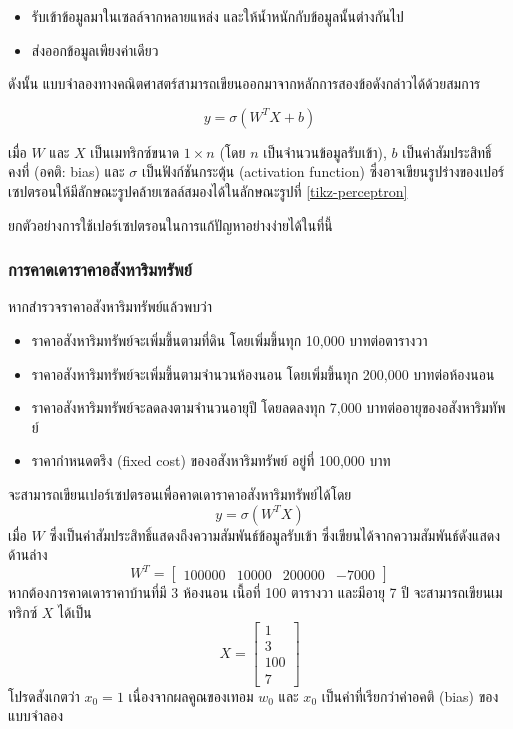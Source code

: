 \begin{itemize}
    \item รับเข้าข้อมูลมาในเซลล์จากหลายแหล่ง และให้น้ำหนักกับข้อมูลนั้นต่างกันไป
    \item ส่งออกข้อมูลเพียงค่าเดียว
\end{itemize}

ดังนั้น แบบจำลองทางคณิตศาสตร์สามารถเขียนออกมาจากหลักการสองข้อดังกล่าวได้ด้วยสมการ

\begin{equation}
y = \sigma\left(W^TX+b\right)
\end{equation}

เมื่อ $W$ และ $X$ เป็นเมทริกซ์ขนาด $1 \times n$ (โดย $n$ เป็นจำนวนข้อมูลรับเข้า), $b$ เป็นค่าสัมประสิทธิ์คงที่ (อคติ: bias)
และ $\sigma$ เป็นฟังก์ชันกระตุ้น (activation function) ซึ่งอาจเขียนรูปร่างของเปอร์เซปตรอนให้มีลักษณะรูปคล้ายเซลล์สมองได้ในลักษณะรูปที่ \ref{tikz-perceptron}

ยกตัวอย่างการใช้เปอร์เซปตรอนในการแก้ปัญหาอย่างง่ายได้ในที่นี้

\subsubsection{การคาดเดาราคาอสังหาริมทรัพย์}
หากสำรวจราคาอสังหาริมทรัพย์แล้วพบว่า
\begin{itemize}
    \item ราคาอสังหาริมทรัพย์จะเพิ่มขึ้นตามที่ดิน โดยเพิ่มขึ้นทุก 10,000 บาทต่อตารางวา
    \item ราคาอสังหาริมทรัพย์จะเพิ่มขึ้นตามจำนวนห้องนอน โดยเพิ่มขึ้นทุก 200,000 บาทต่อห้องนอน
    \item ราคาอสังหาริมทรัพย์จะลดลงตามจำนวนอายุปี โดยลดลงทุก 7,000 บาทต่ออายุของอสังหาริมทัพย์
    \item ราคากำหนดตรึง (fixed cost) ของอสังหาริมทรัพย์ อยู่ที่ 100,000 บาท
\end{itemize}
\noindent
จะสามารถเขียนเปอร์เซปตรอนเพื่อคาดเดาราคาอสังหาริมทรัพย์ได้โดย
$$ y = \sigma\left(W^TX\right) $$
เมื่อ $W$ ซึ่งเป็นค่าสัมประสิทธิ์แสดงถึงความสัมพันธ์ข้อมูลรับเข้า ซึ่งเขียนได้จากความสัมพันธ์ดังแสดงด้านล่าง
$$
    W^T = \begin{bmatrix}
        100000 & 10000 & 200000 & -7000
    \end{bmatrix}
$$
หากต้องการคาดเดาราคาบ้านที่มี 3 ห้องนอน เนื้อที่ 100 ตารางวา และมีอายุ 7 ปี จะสามารถเขียนเมทริกซ์ $X$ ได้เป็น
$$
    X = \begin{bmatrix}
        1 \\
        3 \\
        100 \\
        7
    \end{bmatrix}
$$
โปรดสังเกตว่า $x_0 = 1$ เนื่องจากผลคูณของเทอม $w_0$ และ $x_0$ เป็นค่าที่เรียกว่าค่าอคติ (bias) ของแบบจำลอง

